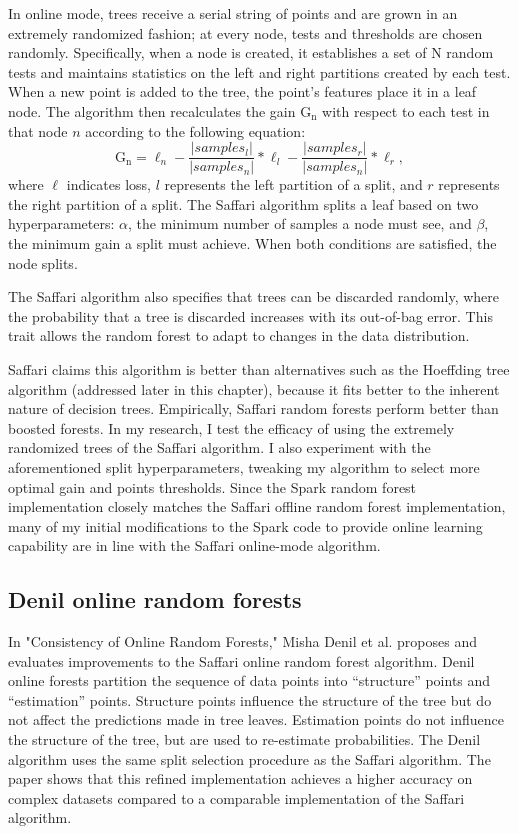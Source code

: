 In online mode, trees receive a serial string of points and are grown in an
extremely randomized fashion; at every node, tests and thresholds are chosen
randomly. Specifically, when a node is created, it establishes a set of N
random tests and maintains statistics on the left and right partitions created
by each test. When a new point is added to the tree, the point's features place
it in a leaf node. The algorithm then recalculates the gain $\mathrm{G_n}$ with
respect to each test in that node $n$ according to the following equation:
\begin{equation} \mathrm{G_n}=\ell_n - \frac{|samples_l|}{|samples_n|}*\ell_l -
\frac{|samples_r|}{|samples_n|}*\ell_r, \end{equation} where $\ell$ indicates
loss, $l$ represents the left partition of a split, and $r$ represents the
right partition of a split. The Saffari algorithm splits a leaf based on two
hyperparameters: $\alpha$, the minimum number of samples a node must see, and
$\beta$, the minimum gain a split must achieve. When both conditions are
satisfied, the node splits.

The Saffari algorithm also specifies that trees can be discarded randomly,
where the probability that a tree is discarded increases with its out-of-bag
error. This trait allows the random forest to adapt to changes in the data
distribution.

Saffari claims this algorithm is better than alternatives such as the Hoeffding
tree algorithm (addressed later in this chapter), because it fits better to the
inherent nature of decision trees. Empirically, Saffari random forests perform
better than boosted forests. In my research, I test the efficacy of using the
extremely randomized trees of the Saffari algorithm. I also experiment with the
aforementioned split hyperparameters, tweaking my algorithm to select more
optimal gain and points thresholds. Since the Spark random forest
implementation closely matches the Saffari offline random forest
implementation, many of my initial modifications to the Spark code to provide
online learning capability are in line with the Saffari online-mode algorithm.

\subsection{Denil online random forests} In "Consistency of Online Random
Forests," Misha Denil et al. proposes and evaluates improvements to the Saffari
online random forest algorithm. Denil online forests partition the sequence of
data points into ``structure'' points and ``estimation'' points. \cite{Denil}
Structure points influence the structure of the tree but do not affect the
predictions made in tree leaves. Estimation points do not influence the
structure of the tree, but are used to re-estimate probabilities. The Denil
algorithm uses the same split selection procedure as the Saffari algorithm. The
paper shows that this refined implementation achieves a higher accuracy on
complex datasets compared to a comparable implementation of the Saffari
algorithm.

